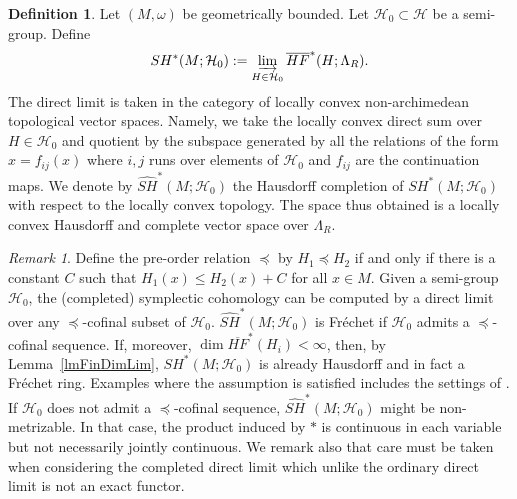 \documentclass[11pt]{amsart}
\theoremstyle{definition}
\newtheorem{df}[tm]{Definition}
\theoremstyle{remark}
\newtheorem{rem}[tm]{Remark}
\begin{document}
\begin{df}\label{dfSympCoh}
Let $(M,\omega)$ be geometrically bounded. Let $\mathcal{H}_0\subset\mathcal{H}$ be a semi-group. Define
\[
SH^*(M;\mathcal{H}_0):=\varinjlim_{H\in\mathcal{H}_0}\overline{HF}^*(H;\Lambda_R).
\]
The direct limit is taken in the category of locally convex non-archimedean topological vector spaces. Namely, we take the locally convex direct sum over ${H\in\mathcal{H}_0}$ and quotient by the subspace generated by all the relations of the form $x=f_{ij}(x)$  where $i,j$ runs over elements of $\mathcal{H}_0$ and $f_{ij}$ are the continuation maps.
We denote by $\widehat{SH}^*(M;\mathcal{H}_0)$ the Hausdorff completion of $SH^*(M;\mathcal{H}_0)$ with respect to the locally convex topology.  The space thus obtained is a locally convex Hausdorff and complete vector space over $\Lambda_R$. %
\end{df}


\begin{rem}\label{rmLocConvDet}
Define the pre-order relation $\preceq$ by $H_1\preceq H_2$ if and only if there is a constant $C$ such that $H_1(x)\leq H_2(x)+C$ for all $x\in M$. Given a semi-group $\mathcal{H}_0$, the (completed) symplectic cohomology can be computed by a direct limit over any $\preceq$-cofinal subset of $\mathcal{H}_0$. $\widehat{SH}^*(M;\mathcal{H}_0)$ is Fr\'echet if $\mathcal{H}_0$ admits a $\preceq$-cofinal sequence. If, moreover, $\dim\overline{HF}^*(H_i)<\infty$, then, by Lemma~\ref{lmFinDimLim}, $SH^*(M;\mathcal{H}_0)$ is already Hausdorff and in fact a Fr\'echet ring. Examples where the assumption is satisfied includes the settings of \cite{Viterbo99,Oancea06,Ritter10}. If $\mathcal{H}_0$ does not admit a $\preceq$-cofinal sequence, $\widehat{SH}^*(M;\mathcal{H}_0)$ might be non-metrizable. In that case, the product induced by $*$ is continuous in each variable but not necessarily jointly continuous. We remark also that care must be taken when considering the completed direct limit which unlike the ordinary direct limit is not an exact functor. %
\end{rem}
\end{document}
